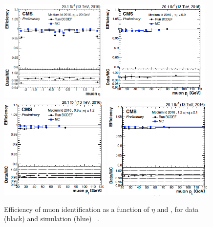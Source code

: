 \begin{figure}[!htpb]
  \centering
  \captionsetup{width=0.98\textwidth,justification=centering}
  \includegraphics[width=0.47\textwidth]{plots/chapter4/muoneffveta.png}
  \includegraphics[width=0.49\textwidth]{plots/chapter4/muoneffvpt1.png} \\
  \includegraphics[width=0.49\textwidth]{plots/chapter4/muoneffvpt2.png}
  \includegraphics[width=0.49\textwidth]{plots/chapter4/muoneffvpt3.png}
  \caption{Efficiency of muon identification as a function of $\eta$ and \pt, for data (black) and simulation (blue) ~\cite{muon_pog}.}
  \label{fig:muoneff}
\end{figure}

